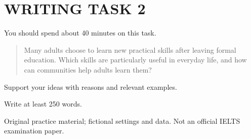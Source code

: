 \section*{WRITING TASK 2}
You should spend about 40 minutes on this task.

\begin{quote}\large Many adults choose to learn new practical skills after leaving formal education. Which skills are particularly useful in everyday life, and how can communities help adults learn them?
\end{quote}
Support your ideas with reasons and relevant examples.

Write at least 250 words.
\par\bigskip
{\footnotesize\color{gray} Original practice material; fictional settings and data. Not an official IELTS examination paper.}
